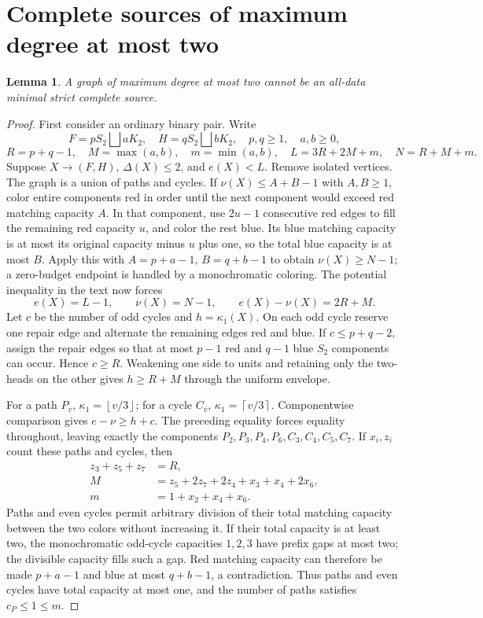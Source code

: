 \documentclass[11pt,a4paper]{article}
\newcommand{\sq}{\bigsqcup}
\newcommand{\floor}[1]{\left\lfloor#1\right\rfloor}
\newcommand{\ceil}[1]{\left\lceil#1\right\rceil}
\newtheorem{lemma}[theorem]{Lemma}
\theoremstyle{definition}
\begin{document}
\section{Complete sources of maximum degree at most two}\label{app:binary}
\begin{lemma}\label{lem:binary-cap}A graph of maximum degree at most two cannot be an all-data minimal strict complete source.
\end{lemma}\begin{proof}
First consider an ordinary binary pair. Write
\[
 F=pS_2\sq aK_2,\quad H=qS_2\sq bK_2,\quad p,q\ge1,\quad a,b\ge0,
\]
\[
 R=p+q-1,\quad M=\max(a,b),\quad m=\min(a,b),\quad
 L=3R+2M+m,\quad N=R+M+m.
\]
Suppose $X\to(F,H)$, $\Delta(X)\le2$, and $e(X)<L$. Remove isolated vertices. The graph is a union of paths and cycles. If $\nu(X)\le A+B-1$ with $A,B\ge1$, color entire components red in order until the next component would exceed red matching capacity $A$. In that component, use $2u-1$ consecutive red edges to fill the remaining red capacity $u$, and color the rest blue. Its blue matching capacity is at most its original capacity minus $u$ plus one, so the total blue capacity is at most $B$. Apply this with $A=p+a-1$, $B=q+b-1$ to obtain $\nu(X)\ge N-1$; a zero-budget endpoint is handled by a monochromatic coloring. The potential inequality in the text now forces
\[
 e(X)=L-1,\qquad \nu(X)=N-1,\qquad e(X)-\nu(X)=2R+M.
\]
Let $c$ be the number of odd cycles and $h=\kappa_1(X)$. On each odd cycle reserve one repair edge and alternate the remaining edges red and blue. If $c\le p+q-2$, assign the repair edges so that at most $p-1$ red and $q-1$ blue $S_2$ components can occur. Hence $c\ge R$. Weakening one side to units and retaining only the two-heads on the other gives $h\ge R+M$ through the uniform envelope.

For a path $P_v$, $\kappa_1=\floor{v/3}$; for a cycle $C_v$, $\kappa_1=\ceil{v/3}$. Componentwise comparison gives $e-\nu\ge h+c$. The preceding equality forces equality throughout, leaving exactly the components $P_2,P_3,P_4,P_6,C_3,C_4,C_5,C_7$. If $x_i,z_i$ count these paths and cycles, then
\begin{align*}
 z_3+z_5+z_7&=R,\\
 M&=z_5+2z_7+2z_4+x_3+x_4+2x_6,\\
 m&=1+x_2+x_4+x_6.
\end{align*}
Paths and even cycles permit arbitrary division of their total matching capacity between the two colors without increasing it. If their total capacity is at least two, the monochromatic odd-cycle capacities $1,2,3$ have prefix gaps at most two; the divisible capacity fills such a gap. Red matching capacity can therefore be made $p+a-1$ and blue at most $q+b-1$, a contradiction. Thus paths and even cycles have total capacity at most one, and the number of paths satisfies $c_P\le1\le m$.


\end{proof}
\end{document}
